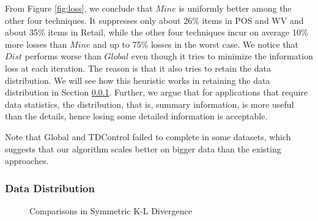 From Figure \ref{fig:loss},
we conclude that $Mine$ is uniformly better among the other four techniques.
It suppresses only about 26\% items in POS and WV and about 35\% items in
Retail, while the other four techniques incur on average 10\% more losses
than  $Mine$ and up to 75\% losses in the worst case. We notice that $Dist$
performs worse than  $Global$ even though it tries to minimize the
information loss at each iteration.
The reason is that it also tries to retain the data
distribution. We will see how this heuristic works in retaining the data
distribution in Section \ref{sec:eval:datadistribution}.
Further, we argue that for applications that require data statistics,
the distribution, that is, summary information, is more useful than the
details, hence losing some detailed information is acceptable.

Note that Global and TDControl failed to complete in some datasets,
which suggests that our algorithm scales better on bigger data than the
existing approaches.

\subsubsection{Data Distribution}\label{sec:eval:datadistribution}

\begin{figure}[th]
\centering
{}
\caption{Comparisons in Symmetric K-L Divergence}
\label{fig:entropy}
\end{figure}

